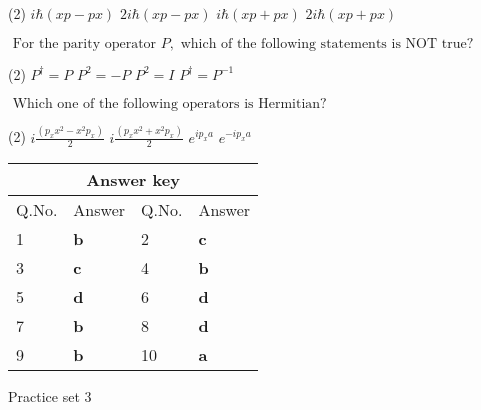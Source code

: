 \begin{enumerate}
\begin{tasks}(2)
	\task[\textbf{A.}] $i \hbar(x p-p x)$
	\task[\textbf{B.}]$2 i \hbar(x p-p x)$
	\task[\textbf{C.}]$i \hbar(x p+p x)$
	\task[\textbf{D.}]$2 i \hbar(x p+p x)$
\end{tasks}
\begin{minipage}{\textwidth}
	\item $\text { For the parity operator } P, \text { which of the following statements is NOT true? }$
\end{minipage}
\begin{tasks}(2)
	\task[\textbf{A.}] $P^{\dagger}=P$
	\task[\textbf{B.}] $P^{2}=-P$
	\task[\textbf{C.}] $P^{2}=I$
	\task[\textbf{D.}]$P^{\dagger}=P^{-1}$
\end{tasks}
\begin{minipage}{\textwidth}
	\item $\text { Which one of the following operators is Hermitian? }$
\end{minipage}
\begin{tasks}(2)
	\task[\textbf{A.}] $i \frac{\left(p_{x} x^{2}-x^{2} p_{x}\right)}{2}$
	\task[\textbf{B.}]$i \frac{\left(p_{x} x^{2}+x^{2} p_{x}\right)}{2}$
	\task[\textbf{C.}]$e^{i p_{x} a}$
	\task[\textbf{D.}]$e^{-i p_{x} a}$
\end{tasks}
\end{enumerate}
\setlength\arrayrulewidth{1pt}
\begin{table}[H]
	\centering
	
	\begin{tabular}{|p{1.5cm}|p{1.5cm}||p{1.5cm}|p{1.5cm}|}
		\hline
		\multicolumn{4}{|c|}{\textbf{Answer key}}\\\hline\hline
		\rowcolor{ocrel}Q.No.&Answer&Q.No.&Answer\\\hline
		1&\textbf{b}&2&\textbf{c}\\\hline
		3&\textbf{c}&4&\textbf{b}\\\hline
		5&\textbf{d}&6&\textbf{d}\\\hline
		7&\textbf{b}&8&\textbf{d}\\\hline
		9&\textbf{b}&10&\textbf{a}\\\hline
	\end{tabular}
\end{table}
\newpage
\begin{abox}
	Practice set 3
	\end{abox}
